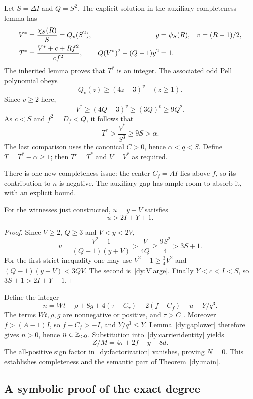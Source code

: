 Let $S=\Delta I$ and $Q=S^2$.  The explicit solution in the auxiliary
completeness lemma has
\begin{align}
 V^*&=\frac{\chi_S(R)}S=Q_v(S^2),&y&=\psi_S(R),&v&=(R-1)/2,\notag\\
 T^*&=\frac{V^*+c+Rf^2}{cf^2},&
 Q(V^*)^2-(Q-1)y^2&=1.
 \label{dy:auxcomplete}
\end{align}
The inherited lemma proves that $T^*$ is an integer.  The associated odd
Pell polynomial obeys
\[
 Q_v(z)\ge(4z-3)^v\quad(z\ge1).
\]
Since $v\ge2$ here,
\begin{equation}
 V^*\ge(4Q-3)^v\ge(3Q)^v\ge9Q^2.
 \label{dy:Vlarge}
\end{equation}
As $c<S$ and $f^2=D_f<Q$, it follows that
\[
 T^*>\frac{V^*}{S^3}\ge9S>\alpha.
\]
The last comparison uses the canonical $C>0$, hence
$\alpha<q<S$.  Define $T=T^*-\alpha\ge1$; then $T'=T^*$ and
$V=V^*$ as required.

There is one new completeness issue: the center $C_f=AI$ lies above
$f$, so its contribution to $n$ is negative.  The auxiliary gap has ample
room to absorb it, with an explicit bound.

\begin{lemma}
\label{dy:gaplower}
For the witnesses just constructed, $u=y-V$ satisfies
\[
 u>2I+Y+1.
\]
\end{lemma}

\begin{proof}
Since $V\ge2$, $Q\ge3$ and $V<y<2V$,
\[
 u=\frac{V^2-1}{(Q-1)(y+V)}
      >\frac V{4Q}
      \ge\frac{9S^2}{4}>3S+1.
\]
For the first strict inequality one may use
$V^2-1\ge\tfrac34V^2$ and
$(Q-1)(y+V)<3QV$.  The second is~\eqref{dy:Vlarge}.
Finally $Y<c<I<S$, so $3S+1>2I+Y+1$.
\end{proof}

Define the integer
\begin{equation}
 n=Wt+\rho+8g+4(\tau-C_\tau)+2(f-C_f)+u-Y/q^3.
 \label{dy:ncomplete}
\end{equation}
The terms $Wt,\rho,g$ are nonnegative or positive, and $\tau>C_\tau$.
Moreover $f>(A-1)I$, so $f-C_f>-I$, and $Y/q^3\le Y$.
Lemma~\ref{dy:gaplower} therefore gives $n>0$, hence $n\in\mathbb Z_{>0}$.
Substitution into~\eqref{dy:carrieridentity} yields
\[
 Z/M=4\tau+2f+y+8d.
\]
The all-positive sign factor in~\eqref{dy:factorization} vanishes, proving
$N=0$.  This establishes completeness and the semantic part of
Theorem~\ref{dy:main}.

\subsection{A symbolic proof of the exact degree}
\label{dy:degree}

